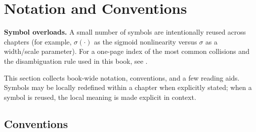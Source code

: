 \section*{Notation and Conventions}

\noindent\textbf{Symbol overloads.} A small number of symbols are intentionally reused across chapters (for example, \(\sigma(\cdot)\) as the sigmoid nonlinearity versus \(\sigma\) as a width/scale parameter). For a one-page index of the most common collisions and the disambiguation rule used in this book, see .

\smallskip
This section collects book-wide notation, conventions, and a few reading aids. Symbols may be locally redefined within a chapter when explicitly stated; when a symbol is reused, the local meaning is made explicit in context.

\subsection*{Conventions}

